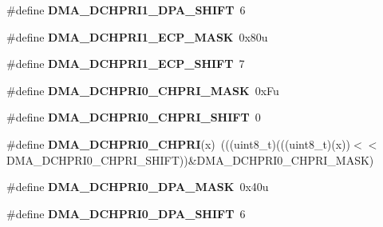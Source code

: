 \begin{DoxyCompactItemize}
\item 
\#define {\bfseries D\+M\+A\+\_\+\+D\+C\+H\+P\+R\+I1\+\_\+\+D\+P\+A\+\_\+\+S\+H\+I\+FT}~6\hypertarget{group__DMA__Register__Masks_ga88db9a46c344a07de9dc96e527e97e4f}{}\label{group__DMA__Register__Masks_ga88db9a46c344a07de9dc96e527e97e4f}

\item 
\#define {\bfseries D\+M\+A\+\_\+\+D\+C\+H\+P\+R\+I1\+\_\+\+E\+C\+P\+\_\+\+M\+A\+SK}~0x80u\hypertarget{group__DMA__Register__Masks_ga14d7f4364a392f0b23a4effdf3f04f4a}{}\label{group__DMA__Register__Masks_ga14d7f4364a392f0b23a4effdf3f04f4a}

\item 
\#define {\bfseries D\+M\+A\+\_\+\+D\+C\+H\+P\+R\+I1\+\_\+\+E\+C\+P\+\_\+\+S\+H\+I\+FT}~7\hypertarget{group__DMA__Register__Masks_ga404b79e3e633ecb770dbf283d8b5fccd}{}\label{group__DMA__Register__Masks_ga404b79e3e633ecb770dbf283d8b5fccd}

\item 
\#define {\bfseries D\+M\+A\+\_\+\+D\+C\+H\+P\+R\+I0\+\_\+\+C\+H\+P\+R\+I\+\_\+\+M\+A\+SK}~0x\+Fu\hypertarget{group__DMA__Register__Masks_ga5d1b7f82e1bbdb7b8e2f15cb88712022}{}\label{group__DMA__Register__Masks_ga5d1b7f82e1bbdb7b8e2f15cb88712022}

\item 
\#define {\bfseries D\+M\+A\+\_\+\+D\+C\+H\+P\+R\+I0\+\_\+\+C\+H\+P\+R\+I\+\_\+\+S\+H\+I\+FT}~0\hypertarget{group__DMA__Register__Masks_gae28baaa3d91720906d6880186c20f7c0}{}\label{group__DMA__Register__Masks_gae28baaa3d91720906d6880186c20f7c0}

\item 
\#define {\bfseries D\+M\+A\+\_\+\+D\+C\+H\+P\+R\+I0\+\_\+\+C\+H\+P\+RI}(x)~(((uint8\+\_\+t)(((uint8\+\_\+t)(x))$<$$<$D\+M\+A\+\_\+\+D\+C\+H\+P\+R\+I0\+\_\+\+C\+H\+P\+R\+I\+\_\+\+S\+H\+I\+FT))\&D\+M\+A\+\_\+\+D\+C\+H\+P\+R\+I0\+\_\+\+C\+H\+P\+R\+I\+\_\+\+M\+A\+SK)\hypertarget{group__DMA__Register__Masks_ga64abfb2d5a1388fd8e110117715685a6}{}\label{group__DMA__Register__Masks_ga64abfb2d5a1388fd8e110117715685a6}

\item 
\#define {\bfseries D\+M\+A\+\_\+\+D\+C\+H\+P\+R\+I0\+\_\+\+D\+P\+A\+\_\+\+M\+A\+SK}~0x40u\hypertarget{group__DMA__Register__Masks_gad746dcaccbad5591a4c76f397bced727}{}\label{group__DMA__Register__Masks_gad746dcaccbad5591a4c76f397bced727}

\item 
\#define {\bfseries D\+M\+A\+\_\+\+D\+C\+H\+P\+R\+I0\+\_\+\+D\+P\+A\+\_\+\+S\+H\+I\+FT}~6\hypertarget{group__DMA__Register__Masks_ga58cc686267da58f32d00143ba6aa5044}{}\label{group__DMA__Register__Masks_ga58cc686267da58f32d00143ba6aa5044}


\end{DoxyCompactItemize}
